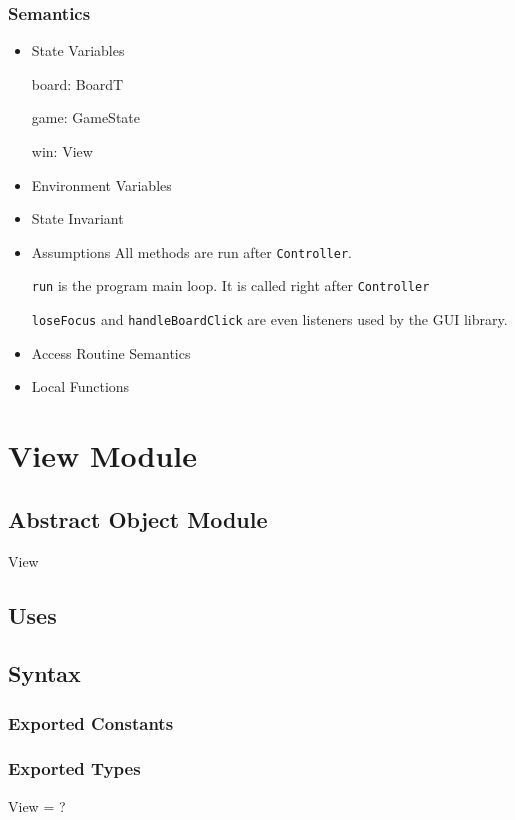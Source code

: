\documentclass[11pt]{article}
\begin{document}
\subsubsection*{Semantics}
\label{sec:org899edbf}
\begin{itemize}
\item State Variables
\label{sec:org409673c}

board: BoardT

game: GameState

win: View

\item Environment Variables
\label{sec:org6c1a5a2}
\item State Invariant
\label{sec:orgdaf57d8}
\item Assumptions
\label{sec:org2ee0999}
All methods are run after \texttt{Controller}.

\texttt{run} is the program main loop. It is called right after \texttt{Controller}

\texttt{loseFocus} and \texttt{handleBoardClick} are even listeners used by the GUI library.

\item Access Routine Semantics
\label{sec:orgdc1395d}
\item Local Functions
\label{sec:org568ea4c}
\end{itemize}

\section{View Module}
\label{sec:orgf93e59a}
\subsection*{Abstract Object Module}
\label{sec:org659c87d}
View
\subsection*{Uses}
\label{sec:orgfc71dfd}

\subsection*{Syntax}
\label{sec:org367fbf9}
\subsubsection*{Exported Constants}
\label{sec:org5bef38c}
\subsubsection*{Exported Types}
\label{sec:org063548e}
View = ?
\end{document}
